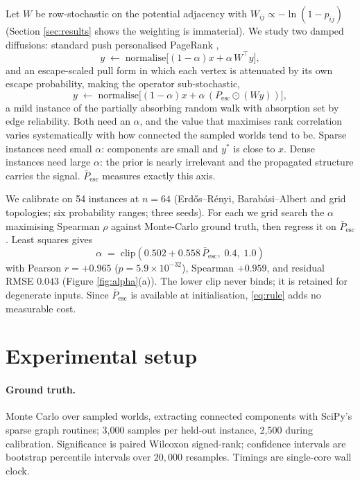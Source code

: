 \documentclass[11pt,a4paper]{article}
\newcommand{\Pesc}{P_{\mathrm{esc}}}
\newcommand{\Pescbar}{\bar{P}_{\mathrm{esc}}}
\newcommand{\clip}{\mathrm{clip}}
\begin{document}
Let $W$ be row-stochastic on the potential adjacency with
$W_{ij}\propto-\ln(1-p_{ij})$ (Section \ref{sec:results} shows the weighting is
immaterial). We study two damped diffusions: standard push personalised
PageRank \cite{pagerank99,haveliwala03},
\begin{equation}
y \;\leftarrow\; \mathrm{normalise}\big[(1-\alpha)x + \alpha\,W^{\!\top}y\big],
\label{eq:push}
\end{equation}
and an escape-scaled pull form in which each vertex is attenuated by its own
escape probability, making the operator sub-stochastic,
\begin{equation}
y \;\leftarrow\; \mathrm{normalise}\big[(1-\alpha)x + \alpha\,(\Pesc\odot(Wy))\big],
\label{eq:pull}
\end{equation}
a mild instance of the partially absorbing random walk \cite{wu12} with
absorption set by edge reliability. Both need an $\alpha$, and the value that
maximises rank correlation varies systematically with how connected the sampled
worlds tend to be. Sparse instances need small $\alpha$: components are small
and $y^*$ is close to $x$. Dense instances need large $\alpha$: the prior is
nearly irrelevant and the propagated structure carries the signal. $\Pescbar$
measures exactly this axis.

We calibrate on 54 instances at $n=64$ (Erdős--Rényi, Barabási--Albert and grid
topologies; six probability ranges; three seeds). For each we grid search the
$\alpha$ maximising Spearman $\rho$ against Monte-Carlo ground truth, then
regress it on $\Pescbar$. Least squares gives
\begin{equation}
\boxed{\;\alpha \;=\; \clip\!\left(0.502 + 0.558\,\Pescbar,\; 0.4,\; 1.0\right)\;}
\label{eq:rule}
\end{equation}
with Pearson $r=+0.965$ ($p=5.9\times10^{-32}$), Spearman $+0.959$, and residual
RMSE $0.043$ (Figure \ref{fig:alpha}(a)). The lower clip never binds; it is
retained for degenerate inputs. Since $\Pescbar$ is available at initialisation,
\eqref{eq:rule} adds no measurable cost.

\section{Experimental setup}
\label{sec:setup}

\paragraph{Ground truth.} Monte Carlo over sampled worlds, extracting connected
components with SciPy's sparse graph routines; 3{,}000 samples per held-out
instance, 2{,}500 during calibration. Significance is paired Wilcoxon
signed-rank; confidence intervals are bootstrap percentile intervals over
$20{,}000$ resamples. Timings are single-core wall clock.
\end{document}
